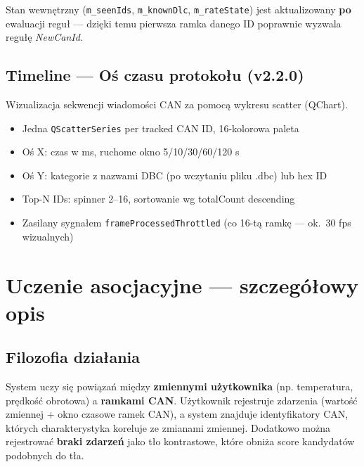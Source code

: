 \documentclass[a4paper,12pt]{article}
\begin{document}
\begin{warnbox}
Stan wewnętrzny (\texttt{m\_seenIds}, \texttt{m\_knownDlc}, \texttt{m\_rateState}) jest aktualizowany \textbf{po} ewaluacji reguł --- dzięki temu pierwsza ramka danego ID poprawnie wyzwala regułę \textit{NewCanId}.
\end{warnbox}

\subsection{Timeline --- Oś czasu protokołu \textnormal{\color{pink}(v2.2.0)}}

Wizualizacja sekwencji wiadomości CAN za pomocą wykresu scatter (QChart).

\begin{itemize}[nosep]
    \item Jedna \texttt{QScatterSeries} per tracked CAN ID, 16-kolorowa paleta
    \item Oś X: czas w ms, ruchome okno 5/10/30/60/120 s
    \item Oś Y: kategorie z nazwami DBC (po wczytaniu pliku .dbc) lub hex ID
    \item Top-N IDs: spinner 2--16, sortowanie wg totalCount descending
    \item Zasilany sygnałem \texttt{frameProcessedThrottled} (co 16-tą ramkę --- ok.\ 30 fps wizualnych)
\end{itemize}

\section{Uczenie asocjacyjne --- szczegółowy opis}

\subsection{Filozofia działania}

System uczy się powiązań między \textbf{zmiennymi użytkownika} (np. temperatura, prędkość obrotowa) a \textbf{ramkami CAN}. Użytkownik rejestruje zdarzenia (wartość zmiennej + okno czasowe ramek CAN), a system znajduje identyfikatory CAN, których charakterystyka koreluje ze zmianami zmiennej. Dodatkowo można rejestrować \textbf{braki zdarzeń} jako tło kontrastowe, które obniża score kandydatów podobnych do tła.
\end{document}
